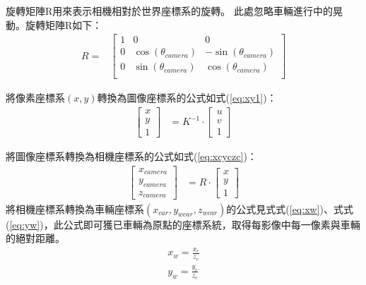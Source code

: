 \documentclass[12pt]{article}       %
\begin{document}
旋轉矩陣R用來表示相機相對於世界座標系的旋轉。
此處忽略車輛進行中的晃動。旋轉矩陣R如下：
\begin{align}
    R=&
    \begin{bmatrix}
        1   & 0  & 0 \\
        0   & \cos(\theta_{camera})   & -\sin(\theta_{camera}) \\
        0   & \sin(\theta_{camera})   & \cos(\theta_{camera}) \\
    \end{bmatrix} 
    \label{eq:R2}
\end{align}

將像素座標系$(x,y)$轉換為圖像座標系的公式如式(\ref{eq:xy1})：
\begin{align}
    \begin{bmatrix}
        x       \\
        y    \\
        1        
    \end{bmatrix} 
     &=K^{-1}\cdot
     \begin{bmatrix}
        u       \\
        v       \\
        1        
    \end{bmatrix} 
    \label{eq:xy1}
\end{align}

將圖像座標系轉換為相機座標系的公式如式(\ref{eq:xcyczc})：
\begin{align}
    \begin{bmatrix}
        x_{camera}   \\
        y_{camera}   \\
        z_{camera}        
    \end{bmatrix} 
     &=R\cdot
     \begin{bmatrix}
        x       \\
        y       \\
        1        
    \end{bmatrix} 
    \label{eq:xcyczc}
\end{align}
將相機座標系轉換為車輛座標系$(x_{car},y_{wcar},z_{wcar})$的公式見式式(\ref{eq:xw})、式式(\ref{eq:yw})，此公式即可獲已車輛為原點的座標系統，取得每影像中每一像素與車輛的絕對距離。
\begin{align}
    x_{w}=\frac{x_{c}}{z_{c}}
    \label{eq:xw}\\
    y_{w}=\frac{y_{c}}{z_{c}}
    \label{eq:yw}
\end{align}
\end{document}
